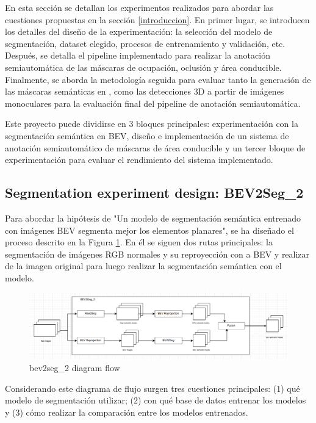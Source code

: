 
En esta sección se detallan los experimentos realizados para abordar las cuestiones propuestas en la sección \ref{introduccion}. En primer lugar, se introducen los detalles del diseño de la experimentación: la selección del modelo de segmentación, dataset elegido, procesos de entrenamiento y validación, etc. Después, se detalla el pipeline implementado para realizar la anotación semiautomática de las máscaras de ocupación, oclusión y área conducible. Finalmente, se aborda la metodología seguida para evaluar tanto la generación de las máscaras semánticas en , como las detecciones 3D a partir de imágenes monoculares para la evaluación final del pipeline de anotación semiautomática.

Este proyecto puede dividirse en 3 bloques principales: experimentación con la segmentación semántica en BEV, diseño e implementación de un sistema de anotación semiautomático de máscaras de área conducible y un tercer bloque de experimentación para evaluar el rendimiento del sistema implementado.

\subsection{Segmentation experiment design: BEV2Seg\_2}
\label{bev2seg_2}

Para abordar la hipótesis de "Un modelo de segmentación semántica entrenado con imágenes BEV segmenta mejor los elementos planares", se ha diseñado el proceso descrito en la Figura \ref{fig:beg2seg_2_flow}. En él se siguen dos rutas principales: la segmentación de imágenes RGB normales y su reproyección con  a BEV y realizar  de la imagen original para luego realizar la segmentación semántica con el modelo.

\begin{figure}[h!]
    \centering
    \includegraphics[width=\linewidth]{./images/metodology/bev2seg_2_flow.png}
    \caption{bev2seg\_2 diagram flow}
    \label{fig:beg2seg_2_flow}
\end{figure}

Considerando este diagrama de flujo surgen tres cuestiones principales: (1) qué modelo de segmentación utilizar; (2) con qué base de datos entrenar los modelos y (3) cómo realizar la comparación entre los modelos entrenados.


